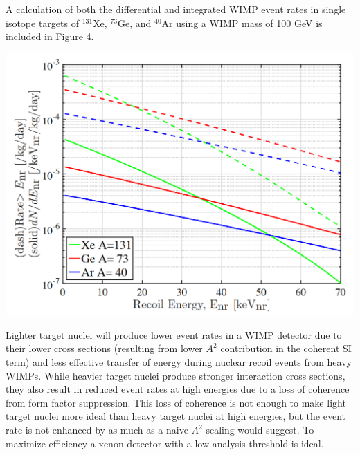 A calculation of both the differential and integrated WIMP event rates in single isotope targets of  $^{131}$Xe, $^{73}$Ge, and $^{40}$Ar using a WIMP mass of 100 GeV is included in Figure 4.

\begin{center}
\includegraphics[scale=0.5]{Recoil-spectrum.png}
\end{center}

Lighter target nuclei will produce lower event rates in a WIMP detector due to their lower cross sections (resulting from lower $A^2$ contribution in the coherent SI term) and less effective transfer of energy during nuclear recoil events from heavy WIMPs. While heavier target nuclei produce stronger interaction cross sections, they also result in reduced event rates at high energies due to a loss of coherence from form factor suppression. This loss of coherence is not enough to make light target nuclei more ideal than heavy target nuclei at high energies, but the event rate is not enhanced by as much as a naive $A^2$ scaling would suggest.  To maximize efficiency a xenon detector with a low analysis threshold is ideal.


